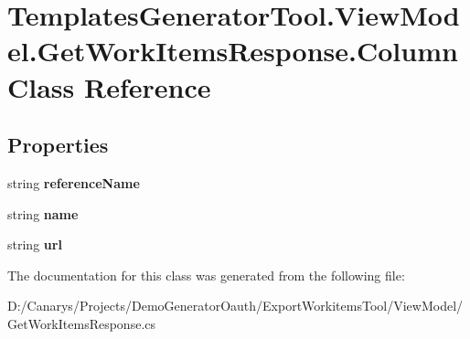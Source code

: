 \hypertarget{class_templates_generator_tool_1_1_view_model_1_1_get_work_items_response_1_1_column}{}\section{Templates\+Generator\+Tool.\+View\+Model.\+Get\+Work\+Items\+Response.\+Column Class Reference}
\label{class_templates_generator_tool_1_1_view_model_1_1_get_work_items_response_1_1_column}
\subsection*{Properties}
\begin{DoxyCompactItemize}
\item 
\mbox{\label{class_templates_generator_tool_1_1_view_model_1_1_get_work_items_response_1_1_column_a1a86c9815be8c7d0a71cf00bd73687d3}} 
string {\bfseries reference\+Name}
\item 
\mbox{\label{class_templates_generator_tool_1_1_view_model_1_1_get_work_items_response_1_1_column_a20579b38cab490fc45c110a5c736397d}} 
string {\bfseries name}
\item 
\mbox{\label{class_templates_generator_tool_1_1_view_model_1_1_get_work_items_response_1_1_column_affc80128ec2121ec5e1c1a5b97367f35}} 
string {\bfseries url}
\end{DoxyCompactItemize}


The documentation for this class was generated from the following file\+:\begin{DoxyCompactItemize}
\item 
D\+:/\+Canarys/\+Projects/\+Demo\+Generator\+Oauth/\+Export\+Workitems\+Tool/\+View\+Model/Get\+Work\+Items\+Response.\+cs\end{DoxyCompactItemize}
